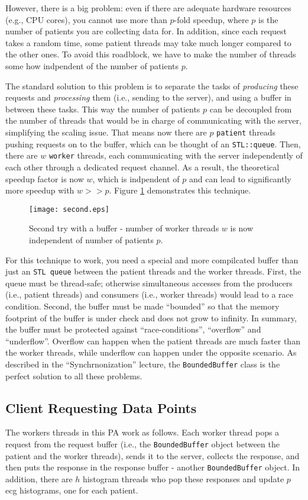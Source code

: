 \documentclass[12pt]{article}
\begin{document}
However, there is a big problem: even if there are adequate hardware resources (e.g., CPU cores), you cannot use more than $p$-fold speedup, where $p$ is the number of patients you are collecting data for. In addition, since each request takes a random time, some patient threads may take much longer compared to the other ones. To avoid this roadblock, we have to make the number of threads some how indpendent of the number of patients $p$. 

The standard solution to this problem is to separate the tasks of \emph{producing} these requests and \emph{processing} them (i.e., sending to the server), and using a buffer in between these tasks. This way the number of patients $p$ can be decoupled from the number of threads that would be in charge of communicating with the server, simplifying the scaling issue. That means now there are $p$ \texttt{patient} threads pushing requests on to the buffer, which can be thought of an \texttt{STL::queue}. Then, there are $w$ \texttt{worker} threads, each communicating with the server independently of each other through a dedicated request channel. As a result, the theoretical speedup factor is now $w$, which is indpendent of $p$ and can lead to significantly more speedup with $w >> p$. Figure \ref{fig:second} demonstrates this technique.

\begin{figure}[t]\centering
	\texttt{[image: second.eps]}
	\caption{Second try with a buffer - number of worker threads $w$ is now independent of number of patients $p$.}
	\label{fig:second}
  \end{figure}

For this technique to work, you need a special and more compilcated buffer than just an \texttt{STL queue} between the patient threads and the worker threads. First, the queue must be thread-safe; otherwise simultaneous accesses from the producers (i.e., patient threads) and consumers (i.e., worker threads) would lead to a race condition. Second, the buffer must be made ``bounded'' so that the memory footprint of the buffer is under check and does not grow to infinity. In summary, the buffer must be protected against ``race-conditions'', ``overflow'' and ``underflow''. Overflow can happen when the patient threads are much faster than the worker threads, while underflow can happen under the opposite scenario. As described in the ``Synchrnonization'' lecture, the \texttt{BoundedBuffer} class is the perfect solution to all these problems. 

\subsection*{Client Requesting Data Points}
The workers threads in this PA work as follows. Each worker thread pops a request from the request buffer (i.e., the \texttt{BoundedBuffer} object between the patient and the worker threads), sends it to the server, collects the response, and then puts the response in the response buffer - another \texttt{BoundedBuffer} object. In addition, there are $h$ histogram threads who pop these responses and update $p$ ecg histograms, one for each patient. 
\end{document}
